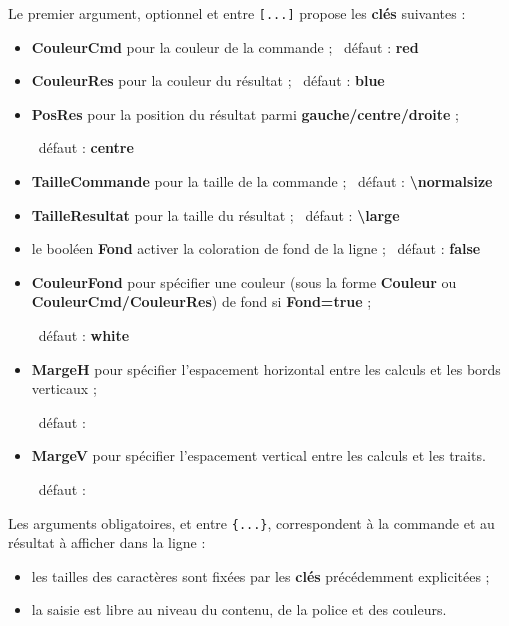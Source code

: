 \documentclass[french,a4paper,11pt]{article}
\newcommand\Cle[1]{{\bfseries\sffamily\textlangle #1\textrangle}}
\newcommand\cmaj[1]{\tcbox[vignetteMaJ]{#1}\xspace}
\begin{document}
\begin{tipblock}
Le premier argument, optionnel et entre \texttt{[...]} propose les \Cle{clés} suivantes :

\begin{itemize}
	\item \Cle{CouleurCmd} pour la couleur de la commande ; \hfill~défaut : \Cle{red}
	\item \Cle{CouleurRes} pour la couleur du résultat ; \hfill~défaut : \Cle{blue}
	\item \cmaj{0.1.3} \Cle{PosRes} pour la position du résultat parmi \Cle{gauche/centre/droite} ; 
	
	\hfill~défaut : \Cle{centre}
	\item \Cle{TailleCommande} pour la taille de la commande ; \hfill~défaut : \Cle{\textbackslash normalsize}
	\item \Cle{TailleResultat} pour la taille du résultat ; \hfill~défaut : \Cle{\textbackslash large}
	\item le booléen \Cle{Fond} activer la coloration de fond de la ligne ; \hfill~défaut : \Cle{false}
	\item \Cle{CouleurFond} pour spécifier une couleur (sous la forme \Cle{Couleur} ou \Cle{CouleurCmd/CouleurRes}) de fond si \Cle{Fond=true} ;
	
	\hfill~défaut : \Cle{white}
	\item \Cle{MargeH} pour spécifier l'espacement horizontal entre les calculs et les bords verticaux ;
	
	\hfill~défaut : \Cle{0.15}
	\item \Cle{MargeV} pour spécifier l'espacement vertical entre les calculs et les traits.
	
	\hfill~défaut : \Cle{6pt}
\end{itemize}
\vspace*{-\baselineskip}\leavevmode
\end{tipblock}

\begin{tipblock}
Les arguments obligatoires, et entre \texttt{\{...\}}, correspondent à la commande et au résultat à afficher dans la ligne :

\begin{itemize}
	\item les tailles des caractères sont fixées par les \Cle{clés} précédemment explicitées ;
	\item la saisie est libre au niveau du contenu, de la police et des couleurs.
\end{itemize}
\end{tipblock}
\end{document}
